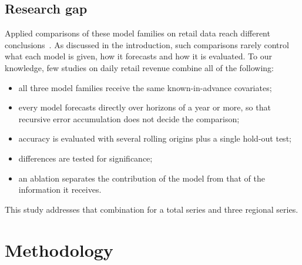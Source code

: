 \documentclass[conference]{IEEEtran}
\begin{document}
\subsection{Research gap}
Applied comparisons of these model families on retail data reach different conclusions~\cite{hasan2022comparative,ensafi2022seasonal,theodoridis2025lstmixer,hobor2026comparative}.
As discussed in the introduction, such comparisons rarely control what each model is given, how it forecasts and how it is evaluated.
To our knowledge, few studies on daily retail revenue combine all of the following:
\begin{itemize}
\item all three model families receive the same known-in-advance covariates;
\item every model forecasts directly over horizons of a year or more, so that recursive error accumulation does not decide the comparison;
\item accuracy is evaluated with several rolling origins plus a single hold-out test;
\item differences are tested for significance;
\item an ablation separates the contribution of the model from that of the information it receives.
\end{itemize}
This study addresses that combination for a total series and three regional series.

\section{Methodology}
\end{document}
